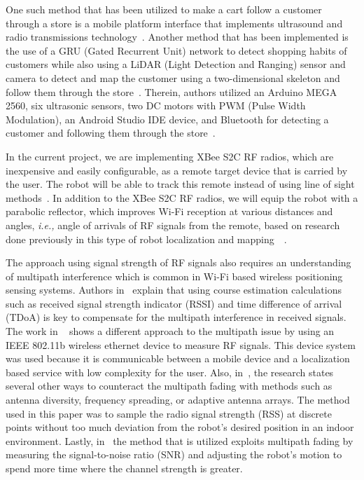 \vspace*{12pt}
\noindent
One such method that has been utilized to make a cart follow a customer through a store is a mobile platform interface that implements ultrasound and radio transmissions technology~\cite{Sales2016-CompaRob}. Another method that has been implemented is the use of a GRU (Gated Recurrent Unit) network to detect shopping habits of customers while also using a LiDAR (Light Detection and Ranging) sensor and camera to detect and map the customer using a two-dimensional skeleton and follow them through the store~\cite{islam_lam_fukuda_kobayashi_kuno_2019}. Therein, authors utilized an Arduino MEGA 2560, six ultrasonic sensors, two DC motors with PWM (Pulse Width Modulation), an Android Studio IDE device, and Bluetooth for detecting a customer and following them through the store~\cite{Rawashdeh2017-Person}.

\vspace*{12pt}
\noindent
In the current project, we are implementing XBee S2C RF radios, which are inexpensive and easily configurable, as a remote target device that is carried by the user. The robot will be able to track this remote instead of using line of sight methods~\cite{Miah2018-Intelligent}. In addition to the XBee S2C RF radios, we will equip the robot with a parabolic reflector, which improves Wi-Fi reception at various distances and angles, \textit{i.e.,} angle of arrivals of RF signals from the remote, based on research done previously in this type of robot localization and mapping~\cite{Miah2018-Intelligent}~\cite{Li2013ANA}.

\vspace*{12pt}
\noindent
The approach using signal strength of RF signals also requires an understanding of multipath interference which is common in Wi-Fi based wireless positioning sensing systems. Authors in~\cite{xie_jiang_zhao_zhang_2019} explain that using course estimation calculations such as received signal strength indicator (RSSI) and time difference of arrival (TDoA) is key to compensate for the multipath interference in received signals. The work in ~\cite{ladd_bekris_rudys_kavraki_wallach_2005} shows a different approach to the multipath issue by using an IEEE 802.11b wireless ethernet device to measure RF signals. This device system was used because it is communicable between a mobile device and a localization based service with low complexity for the user. Also, in~\cite{lindhe_johansson_bicchi_2007}, the research states several other ways to counteract the multipath fading with methods such as antenna diversity, frequency spreading, or adaptive antenna arrays. The method used in this paper was to sample the radio signal strength (RSS) at discrete points without too much deviation from the robot's desired position in an indoor environment. Lastly, in~\cite{Lindhe2009} the method that is utilized exploits multipath fading by measuring the signal-to-noise ratio (SNR) and adjusting the robot's motion to spend more time where the channel strength is greater.

